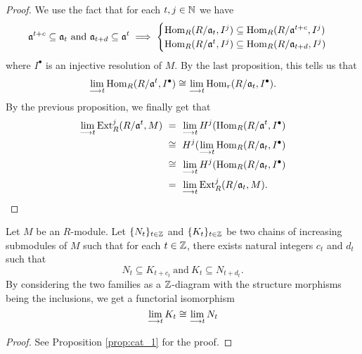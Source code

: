 \documentclass[11pt, a4paper, twoside]{article}
\begin{document}
\begin{proof}
    We use the fact that for each $t,j\in\mathbb{N}$ we have 
    \begin{displaymath}
        \mathfrak{a}^{t+c}\subseteq\mathfrak{a}_t\ \mathrm{and}\ \mathfrak{a}_{t+d}\subseteq\mathfrak{a}^t\implies
        \begin{cases}
            \Hom_R(R/\mathfrak{a}_t,I^j)\subseteq\Hom_ R(R/\mathfrak{a}^{t+c},I^j)\\
            \Hom_R(R/\mathfrak{a}^t,I^j)\subseteq\Hom_R(R/\mathfrak{a}_{t+d},I^j)     
        \end{cases}
    \end{displaymath}
    where $I^{\bullet}$ is an injective resolution of $M$. By the last proposition, this tells us that 
    \begin{displaymath}
        \lim\limits_{\longrightarrow t}\operatorname{Hom}_R(R/\mathfrak{a}^t,I^{\bullet})\cong\lim\limits_{\longrightarrow t}\operatorname{Hom}_r(R/\mathfrak{a}_t,I^{\bullet}).
    \end{displaymath}
    By the previous proposition, we finally get that 
    \begin{align*}
        \lim\limits_{\ra t}\Ext^j_R(R/\mathfrak{a}^t,M)\ &=\ \lim\limits_{\ra t}H^j(\Hom_R(R/\mathfrak{a}^t,I^{\bullet})\\
        &\cong\ H^j(\lim\limits_{\ra t}\Hom_R(R/\mathfrak{a}_t,I^{\bullet})\\
        &\cong\ \lim\limits_{\ra t}H^j(\Hom_R(R/\mathfrak{a}_t,I^{\bullet})\\
        &=\ \lim\limits_{\ra t}\Ext^j_R(R/\mathfrak{a}_t,M).
    \end{align*}
\end{proof}
\begin{prop}
    Let $M$ be an $R$-module. Let $\{N_t\}_{t\in\mathbb{Z}}$ and $\{K_t\}_{t\in\mathbb{Z}}$ be two chains of increasing submodules of $M$ such that for each $t\in\mathbb{Z}$, there exists natural integers $c_t$ and $d_t$ such that 
    \begin{displaymath}
        N_t\subseteq K_{t+c_t}\ \mathrm{and}\ K_t\subseteq N_{t+d_t}.
    \end{displaymath}
    By considering the two families as a $\mathbb{Z}$-diagram with the structure morphisms being the inclusions, we get a functorial isomorphism
    \begin{displaymath}
        \lim\limits_{\longrightarrow t}K_t\cong\lim\limits_{\longrightarrow t}N_t
    \end{displaymath}
\end{prop}
\begin{proof}
    See Proposition \ref{prop:cat_1} for the proof.
\end{proof}
\end{document}
